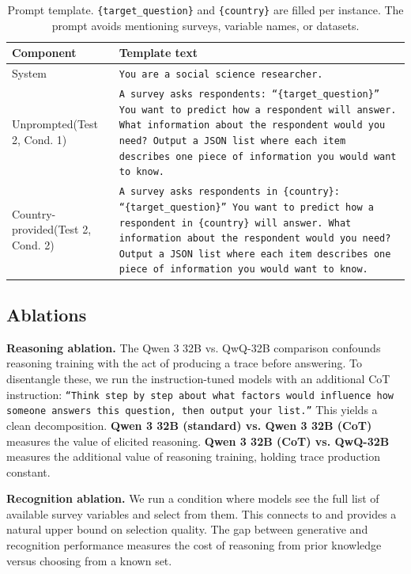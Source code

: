 \documentclass[11pt]{article}
\begin{document}
\begin{table}[h]
\centering
\caption{Prompt template. \texttt{\{target\_question\}} and \texttt{\{country\}} are filled per instance. The prompt avoids mentioning surveys, variable names, or datasets.}
\label{tab:prompts}
\renewcommand{\arraystretch}{1.5}
\begin{tabular}{>{\raggedright\arraybackslash}p{2.6cm} p{10.5cm}}
\toprule
\textbf{Component} & \textbf{Template text} \\
\midrule
System &
\texttt{You are a social science researcher.} \\
\midrule
Unprompted\newline(Test 2, Cond. 1) &
\texttt{A survey asks respondents: ``\{target\_question\}'' You want to predict how a respondent will answer. What information about the respondent would you need? Output a JSON list where each item describes one piece of information you would want to know.} \\
\midrule
Country-provided\newline(Test 2, Cond. 2) &
\texttt{A survey asks respondents in \{country\}: ``\{target\_question\}'' You want to predict how a respondent in \{country\} will answer. What information about the respondent would you need? Output a JSON list where each item describes one piece of information you would want to know.} \\
\bottomrule
\end{tabular}
\renewcommand{\arraystretch}{1.0}
\end{table}

\subsection{Ablations}

\textbf{Reasoning ablation.} The Qwen 3 32B vs. QwQ-32B comparison confounds reasoning training with the act of producing a trace before answering. To disentangle these, we run the instruction-tuned models with an additional CoT instruction: \texttt{``Think step by step about what factors would influence how someone answers this question, then output your list.''} This yields a clean decomposition. \textbf{Qwen 3 32B (standard) vs. Qwen 3 32B (CoT)} measures the value of elicited reasoning. \textbf{Qwen 3 32B (CoT) vs. QwQ-32B} measures the additional value of reasoning training, holding trace production constant.

\textbf{Recognition ablation.} We run a condition where models see the full list of available survey variables and select from them. This connects to \citet{jeong2024llmselect} and provides a natural upper bound on selection quality. The gap between generative and recognition performance measures the cost of reasoning from prior knowledge versus choosing from a known set.
\end{document}
